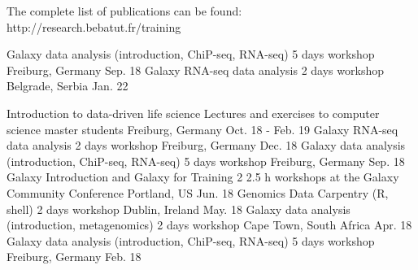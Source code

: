 
\begin{small}
The complete list of publications can be found: http://research.bebatut.fr/training
\end{small}

\begin{cvhonors}
  \cvhonor
    {Galaxy data analysis (introduction, ChiP-seq, RNA-seq)} %
    {5 days workshop} %
    {Freiburg, Germany} %
    {Sep. 18} %
  \cvhonor
    {Galaxy RNA-seq data analysis} %
    {2 days workshop} %
    {Belgrade, Serbia} %
    {Jan. 22} %
\end{cvhonors}

\begin{cvhonors}
  \cvhonor
    {Introduction to data-driven life science} %
    {Lectures and exercises to computer science master students} %
    {Freiburg, Germany} %
    {Oct. 18 - Feb. 19} %
  \cvhonor
    {Galaxy RNA-seq data analysis} %
    {2 days workshop} %
    {Freiburg, Germany} %
    {Dec. 18} %
  \cvhonor
    {Galaxy data analysis (introduction, ChiP-seq, RNA-seq)} %
    {5 days workshop} %
    {Freiburg, Germany} %
    {Sep. 18} %
\cvhonor
    {Galaxy Introduction and Galaxy for Training} %
    {2 2.5 h workshops at the Galaxy Community Conference} %
    {Portland, US} %
    {Jun. 18} %
  \cvhonor
    {Genomics Data Carpentry (R, shell)} %
    {2 days workshop} %
    {Dublin, Ireland} %
    {May. 18} %
\cvhonor
    {Galaxy data analysis (introduction, metagenomics)} %
    {2 days workshop} %
    {Cape Town, South Africa} %
    {Apr. 18} %
  \cvhonor
    {Galaxy data analysis (introduction, ChiP-seq, RNA-seq)} %
    {5 days workshop} %
    {Freiburg, Germany} %
    {Feb. 18} %
\end{cvhonors}

